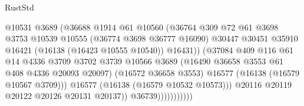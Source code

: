 \begin{lexlean}{RustStd}
\begin{coremodule}
                                              @10531
                                              @3689
                                              (@36688
                                                @1914
                                                @61
                                                @10560
                                                (@36764
                                                  @309
                                                  @72
                                                  @61
                                                  @3698
                                                  @3753
                                                  @10539
                                                  @10555
                                                  (@36774 @3698 @36777 @16090)
                                                  @30447
                                                  @30451
                                                  @35910
                                                  @16421
                                                  (@16138 (@16423 @10555 @10540))
                                                  @16431))
                                              (@37084
                                                @409
                                                @116
                                                @61
                                                @14
                                                @4336
                                                @3709
                                                @3702
                                                @3739
                                                @10566
                                                @3689
                                                (@16490 @36658 @3553 @61 @408 @4336 @20093 @20097)
                                                (@16572 @36658 @3553)
                                                @16577
                                                (@16138 (@16579 @10567 @3709)))
                                              @16577
                                              (@16138 (@16579 @10532 @10573)))
                                            @20116
                                            @20119
                                            @20122
                                            @20126
                                            @20131
                                            @20137))
                                        @36739)))))))))))

\end{coremodule}
\end{lexlean}
